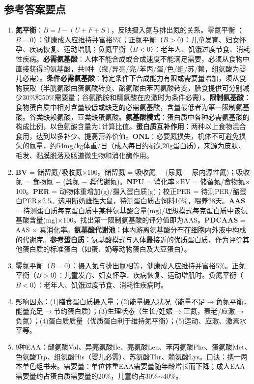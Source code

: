 {\subsection*{参考答案要点}
\begin{enumerate}[leftmargin=*, itemsep=5pt]
    \item \textbf{氮平衡}：$B = I - (U + F + S)$，反映摄入氮与排出氮的关系。零氮平衡（$B=0$）：健康成人应维持并富裕5\%；正氮平衡（$B>0$）：儿童发育、妇女怀孕、疾病恢复、运动增肌；负氮平衡（$B<0$）：老年人、饥饿过度节食、消耗性疾病。\textbf{必需氨基酸}：人体不能合成或合成速度不能满足需要，必须从食物中直接获得的氨基酸，共9种（缬/异亮/亮/苯丙/蛋/色/组/苏/赖，组氨酸为婴儿必需）。\textbf{条件必需氨基酸}：特定条件下合成能力有限或需要量增加，须从食物获取（半胱氨酸由蛋氨酸转变、酪氨酸由苯丙氨酸转变，膳食提供可分别减少30\%和50\%需要量；谷氨酰胺和精氨酸在应激时为条件必需）。\textbf{限制氨基酸}：食物蛋白质中相对含量较低或缺乏的必需氨基酸，含量最低者为第一限制氨基酸。谷类缺赖氨酸，豆类缺蛋氨酸。\textbf{氨基酸模式}：蛋白质中各种必需氨基酸的构成比例，以色氨酸含量为1计算比值。\textbf{蛋白质互补作用}：两种以上食物混合食用，达到以多补少、提高营养价值。\textbf{ONL}：必要氮损失，机体不可避免损失的氮量，约54mg/kg体重/日（成人每日约损失20g蛋白质），来源为皮肤、毛发、黏膜脱落及肠道微生物和消化酶作用。
    \item \textbf{BV} = 储留氮/吸收氮$\times$100。储留氮 = 吸收氮 $-$ (尿氮 $-$ 尿内源性氮)；吸收氮 = 食物氮 $-$ (粪氮 $-$ 粪代谢氮)。\textbf{NPU} = 消化率$\times$BV = 储留氮/食物氮$\times$100。\textbf{PER} = 动物体重增加(g)/摄入蛋白质(g)；校正PER = 待测PER/酪蛋白PER$\times$2.5。选用断奶雄性大鼠，待测蛋白质占饲料10\%，喂养28天。\textbf{AAS} = 待测蛋白质每克蛋白质中某种氨基酸含量(mg)/理想模式每克蛋白质中该氨基酸含量(mg)$\times$100。找出第一限制氨基酸的评分值即为AAS。\textbf{PDCAAS} = AAS $\times$ 真消化率。\textbf{氨基酸代谢池}：体内游离氨基酸分布在细胞内外液中构成的代谢库。\textbf{参考蛋白质}：氨基酸模式与人体最接近的优质蛋白质，作为评价其他蛋白质的标准蛋白（如蛋、奶等动物蛋白及大豆蛋白）。
    \item 零氮平衡（$B=0$）：摄入氮与排出氮相等，健康成人应维持并富裕5\%。正氮平衡（$B>0$）：儿童发育、妇女怀孕、疾病恢复、运动增肌时。负氮平衡（$B<0$）：老年人、饥饿过度节食、消耗性疾病时。
    \item 影响因素：(1)膳食蛋白质摄入量；(2)能量摄入状况（能量不足$\rightarrow$负氮平衡，能量充足$\rightarrow$节约蛋白质）；(3)生理状态（生长/妊娠$\rightarrow$正氮，衰老/应激$\rightarrow$负氮）；(4)蛋白质质量（优质蛋白利于维持氮平衡）；(5)运动、应激、激素水平等。
    \item 9种EAA：缬氨酸Val、异亮氨酸Ile、亮氨酸Leu、苯丙氨酸Phe、蛋氨酸Met、色氨酸Trp、组氨酸His（婴儿必需）、苏氨酸Thr、赖氨酸Lys。口诀：携一两本单色组书来。需要量：单位体重EAA需要量随年龄增长而下降；成人EAA需要量约占蛋白质需要量的20\%，儿童约占30\%$\sim$40\%。

\end{enumerate}}
